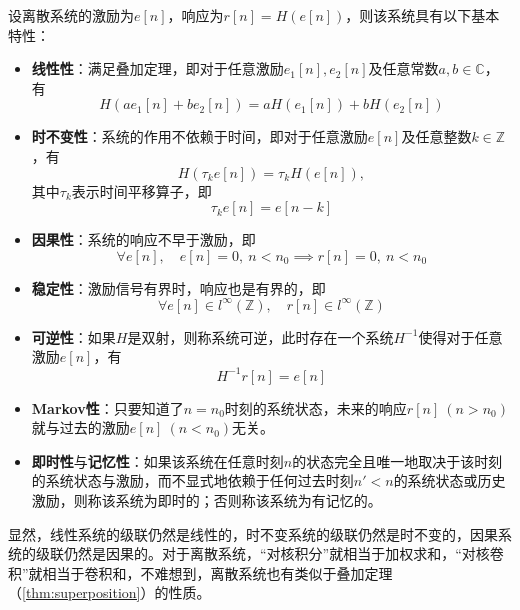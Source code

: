 \begin{definition}\label{def:discrete_system}
    设离散系统的激励为$e[n]$，响应为$r[n]=H(e[n])$，则该系统具有以下基本特性：
    \begin{itemize}
        \item \textbf{线性性}：满足叠加定理，即对于任意激励$e_1[n],e_2[n]$及任意常数$a,b\in\mathbb{C}$，有
        \begin{equation}
            H(ae_1[n]+be_2[n])=aH(e_1[n])+bH(e_2[n])
        \end{equation}
        \item \textbf{时不变性}：系统的作用不依赖于时间，即对于任意激励$e[n]$及任意整数$k\in\mathbb{Z}$，有
        \begin{equation}
            H(\tau_k e[n])=\tau_k H(e[n]),
        \end{equation}
        其中$\tau_k$表示时间平移算子，即
        \begin{equation}
            \tau_k e[n]=e[n-k]
        \end{equation}
        \item \textbf{因果性}：系统的响应不早于激励，即
        \begin{equation}
            \forall e[n],\quad e[n]=0,\ n<n_0\implies r[n]=0,\ n<n_0
        \end{equation}
        \item \textbf{稳定性}：激励信号有界时，响应也是有界的，即
        \begin{equation}
            \forall e[n]\in l^{\infty}(\mathbb{Z}),\quad r[n]\in l^{\infty}(\mathbb{Z})
        \end{equation}
        \item \textbf{可逆性}：如果$H$是双射，则称系统可逆，此时存在一个系统$H^{-1}$使得对于任意激励$e[n]$，有
        \begin{equation}
            H^{-1}r[n]=e[n]
        \end{equation}
        \item \textbf{Markov性}：只要知道了$n=n_0$时刻的系统状态，未来的响应$r[n]\ (n>n_0)$就与过去的激励$e[n]\ (n<n_0)$无关。
        \item \textbf{即时性}与\textbf{记忆性}：如果该系统在任意时刻$n$的状态完全且唯一地取决于该时刻的系统状态与激励，而不显式地依赖于任何过去时刻$n'<n$的系统状态或历史激励，则称该系统为即时的；否则称该系统为有记忆的。
    \end{itemize}
\end{definition}

显然，线性系统的级联仍然是线性的，时不变系统的级联仍然是时不变的，因果系统的级联仍然是因果的。对于离散系统，“对核积分”就相当于加权求和，“对核卷积”就相当于卷积和，不难想到，离散系统也有类似于叠加定理（\cref{thm:superposition}）的性质。

